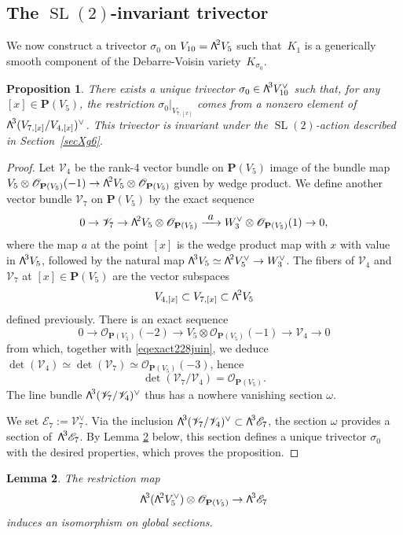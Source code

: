 \documentclass[11pt]{article}
\let\mathcal\mathscr
\newcommand\To[1]{\mathchoice{\xrightarrow{\textstyle\kern4pt#1\kern3pt}}{\stackrel{#1}{\longrightarrow}}{}{}}
\newtheorem{lemm}{Lemma}[section]
\newtheorem{prop}[lemm]{Proposition}
\theoremstyle{definition}
\renewcommand\P{{\mathbf P}}\let\PP\P
\newcommand\cE{\mathcal{E}}
\newcommand\cO{\mathcal{O}}\let\OO\cO
\newcommand\cV{\mathcal{V}}
\let\isom\simeq
\let\cong\simeq
\let\dual\vee
\DeclareMathOperator{\SL}{SL}
\newcommand\bw[1]{{\hbox{\large$\mathsf{\Lambda}$}^{\!#1}}}
\begin{document}
\subsection{The $\SL(2)$-invariant trivector}\label{se62}

We now construct a trivector $\sigma_0$ on $V_{10}=\bw2V_5$ such that~$K_1$ is a generically smooth component of the Debarre-Voisin
variety~$K_{\sigma_0}$.

\begin{prop}\label{proexistencesigma}
There exists a unique trivector
$\sigma_0\in \bw3V_{10}^\dual$ such that,
for any \hbox{$[x]\!\in\!\P(V_5)$},
the restriction
$\sigma_{0}\vert_{ V_{7,[x]}}$ comes from a nonzero element of $\bw3(V_{7,[x]}/V_{4,[x]})^\dual$. This trivector is invariant under the $\SL(2)$-action described in Section~\ref{secXg6}.
\end{prop}

\begin{proof}
Let $\cV_4$ be the rank-4 vector bundle on $\P(V_5)$ image of the
bundle map $V_5\otimes \cO_{\P(V_5)}(-1)
\to\bw2V_5\otimes \cO_{\P(V_5)}$ given by wedge product. We define another vector bundle
$\cV_7$ on $\P(V_5)$ by the exact sequence
\begin{equation} \label{eqexact228juin}
0\to \cV_7\to \bw2V_5\otimes \cO_{\P(V_5)}
\To{a} W^\dual_3\otimes \cO_{\P(V_5)}(1)\to 0,
\end{equation}
where the map $a$ at the point $[x]$ is the wedge product map with $x$ with value in
$\bw3V_5$, followed by the natural map $\bw3V_5\cong \bw2 V_5^\dual\to W_3^\dual$. The fibers of $\cV_4$ and $\cV_7$ at $[x]\in \P(V_5)$ are the vector subspaces
\[
V_{4,[x]}\subset V_{7,[x]}\subset \bw2V_5 
\]
defined previously. There is an exact sequence
\[
0\to \cO_{\P(V_5)}(-2)\to V_5\otimes \cO_{\P(V_5)}(-1)
\to \cV_4 \to 0
\]
from which, together with \eqref{eqexact228juin}, we deduce
$\det (\cV_4)\isom \det ( \cV_7)\isom\cO_{\P(V_5)}(-3) $,
hence
\[
\det(\cV_7/\cV_4)=\cO_{\P(V_5)}.
\]
The line bundle $\bw3(\cV_7/\cV_4)^\dual$ thus has a nowhere vanishing section
$\omega$.

We set $\cE_7:=\cV_7^\dual$. Via the inclusion $\bw3(\cV_7/\cV_4)^\dual\subset \bw3\cE_7$, the section ${\omega}$ provides a section of~$\bw3\cE_7$. By Lemma \ref{leisosection} below, this section defines a unique trivector $\sigma_0$ with the desired properties, which proves the proposition.\end{proof}

\begin{lemm}\label{leisosection}
The restriction map
\[
\bw3(\bw2V_5^\dual)\otimes \cO_{\P(V_5)}\to \bw3\cE_7
\]
induces an isomorphism on global sections.
\end{lemm}
\end{document}

